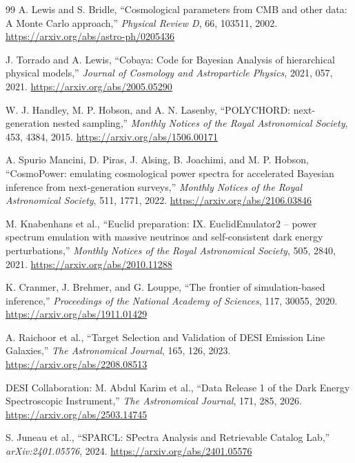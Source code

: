 \begin{thebibliography}{99}
A. Lewis and S. Bridle,
``Cosmological parameters from CMB and other data: A Monte Carlo approach,''
\emph{Physical Review D}, 66, 103511, 2002.
\url{https://arxiv.org/abs/astro-ph/0205436}

J. Torrado and A. Lewis,
``Cobaya: Code for Bayesian Analysis of hierarchical physical models,''
\emph{Journal of Cosmology and Astroparticle Physics}, 2021, 057, 2021.
\url{https://arxiv.org/abs/2005.05290}

W. J. Handley, M. P. Hobson, and A. N. Lasenby,
``POLYCHORD: next-generation nested sampling,''
\emph{Monthly Notices of the Royal Astronomical Society}, 453, 4384, 2015.
\url{https://arxiv.org/abs/1506.00171}

A. Spurio Mancini, D. Piras, J. Alsing, B. Joachimi, and M. P. Hobson,
``CosmoPower: emulating cosmological power spectra for accelerated Bayesian inference from next-generation surveys,''
\emph{Monthly Notices of the Royal Astronomical Society}, 511, 1771, 2022.
\url{https://arxiv.org/abs/2106.03846}

M. Knabenhans et al.,
``Euclid preparation: IX. EuclidEmulator2 -- power spectrum emulation with massive neutrinos and self-consistent dark energy perturbations,''
\emph{Monthly Notices of the Royal Astronomical Society}, 505, 2840, 2021.
\url{https://arxiv.org/abs/2010.11288}

K. Cranmer, J. Brehmer, and G. Louppe,
``The frontier of simulation-based inference,''
\emph{Proceedings of the National Academy of Sciences}, 117, 30055, 2020.
\url{https://arxiv.org/abs/1911.01429}

A. Raichoor et al.,
``Target Selection and Validation of DESI Emission Line Galaxies,''
\emph{The Astronomical Journal}, 165, 126, 2023.
\url{https://arxiv.org/abs/2208.08513}

DESI Collaboration: M. Abdul Karim et al.,
``Data Release 1 of the Dark Energy Spectroscopic Instrument,''
\emph{The Astronomical Journal}, 171, 285, 2026.
\url{https://arxiv.org/abs/2503.14745}

S. Juneau et al.,
``SPARCL: SPectra Analysis and Retrievable Catalog Lab,''
\emph{arXiv:2401.05576}, 2024.
\url{https://arxiv.org/abs/2401.05576}


\end{thebibliography}
